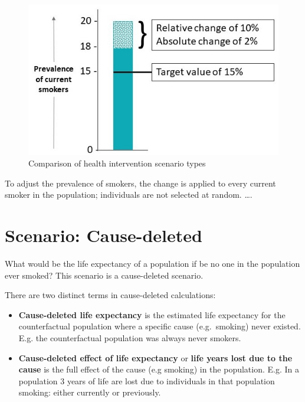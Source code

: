 \documentclass[]{book}
\begin{document}
\begin{figure}

{\centering \includegraphics{Images/Scenario-Abs, Rel, Target cropped} 

}

\caption{Comparison of health intervention scenario types}\label{fig:unnamed-chunk-10}
\end{figure}

To adjust the prevalence of smokers, the change is applied to every
current smoker in the population; individuals are not selected at
random. \ldots{}.

\section{Scenario: Cause-deleted}\label{scenario-cause-deleted}

What would be the life expectancy of a population if be no one in the
population ever smoked? This scenario is a cause-deleted scenario.

There are two distinct terms in cause-deleted calculations:

\begin{itemize}
\item
  \textbf{Cause-deleted life expectancy} is the estimated life
  expectancy for the counterfactual population where a specific cause
  (e.g.~smoking) never existed. E.g. the counterfactual population was
  always never smokers.
\item
  \textbf{Cause-deleted effect of life expectancy} or \textbf{life years
  lost due to the cause} is the full effect of the cause (e.g smoking)
  in the population. E.g. In a population 3 years of life are lost due
  to individuals in that population smoking: either currently or
  previously.
\end{itemize}
\end{document}
